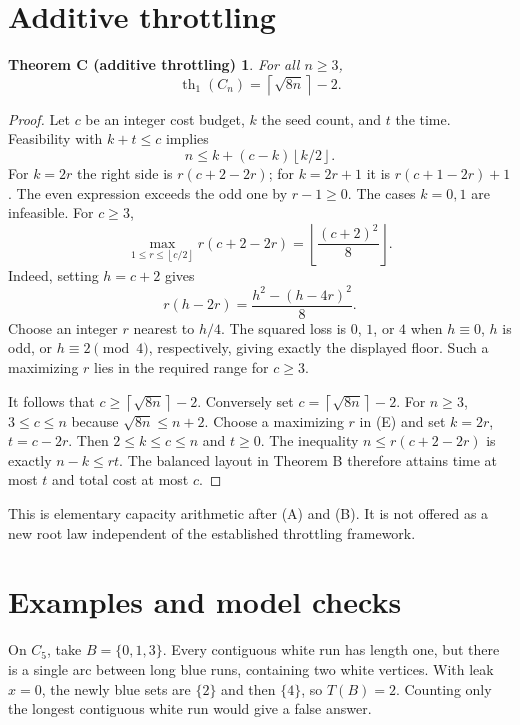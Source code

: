 \documentclass[11pt,a4paper]{article}
\newcommand{\ceil}[1]{\left\lceil #1\right\rceil}
\newcommand{\floor}[1]{\left\lfloor #1\right\rfloor}
\newcommand{\thone}{\operatorname{th}_1}
\newtheorem*{theoremC}{Theorem C (additive throttling)}
\begin{document}
\section{Additive throttling}

\begin{theoremC}
For all $n\geq3$,
\begin{equation}
 \thone(C_n)=\ceil{\sqrt{8n}}-2. \tag{D}\label{eq:D}
\end{equation}
\end{theoremC}
\begin{proof}
Let $c$ be an integer cost budget, $k$ the seed count, and $t$ the time.
Feasibility with $k+t\leq c$ implies
\[
 n\leq k+(c-k)\floor{k/2}.
\]
For $k=2r$ the right side is $r(c+2-2r)$; for $k=2r+1$ it is
$r(c+1-2r)+1$. The even expression exceeds the odd one by $r-1\geq0$.
The cases $k=0,1$ are infeasible. For $c\geq3$,
\begin{equation}
 \max_{1\leq r\leq\floor{c/2}} r(c+2-2r)
       =\floor{\frac{(c+2)^2}{8}}. \tag{E}\label{eq:E}
\end{equation}
Indeed, setting $h=c+2$ gives
\[
 r(h-2r)=\frac{h^2-(h-4r)^2}{8}.
\]
Choose an integer $r$ nearest to $h/4$. The squared loss is $0$, $1$, or
$4$ when $h\equiv0$, $h$ is odd, or $h\equiv2\pmod4$, respectively,
giving exactly the displayed floor. Such a maximizing $r$ lies in the
required range for $c\geq3$.

It follows that $c\geq\ceil{\sqrt{8n}}-2$. Conversely set
$c=\ceil{\sqrt{8n}}-2$. For $n\geq3$, $3\leq c\leq n$ because
$\sqrt{8n}\leq n+2$. Choose a maximizing $r$ in (E) and set
$k=2r$, $t=c-2r$. Then $2\leq k\leq c\leq n$ and $t\geq0$.
The inequality $n\leq r(c+2-2r)$ is exactly $n-k\leq rt$.
The balanced layout in Theorem B therefore attains time at most $t$ and
total cost at most $c$.
\end{proof}

This is elementary capacity arithmetic after (A) and (B). It is not offered
as a new root law independent of the established throttling framework.

\section{Examples and model checks}

On $C_5$, take $B=\{0,1,3\}$. Every contiguous white run has length one,
but there is a single arc between long blue runs, containing two white
vertices. With leak $x=0$, the newly blue sets are $\{2\}$ and then
$\{4\}$, so $T(B)=2$. Counting only the longest contiguous white run
would give a false answer.
\end{document}
